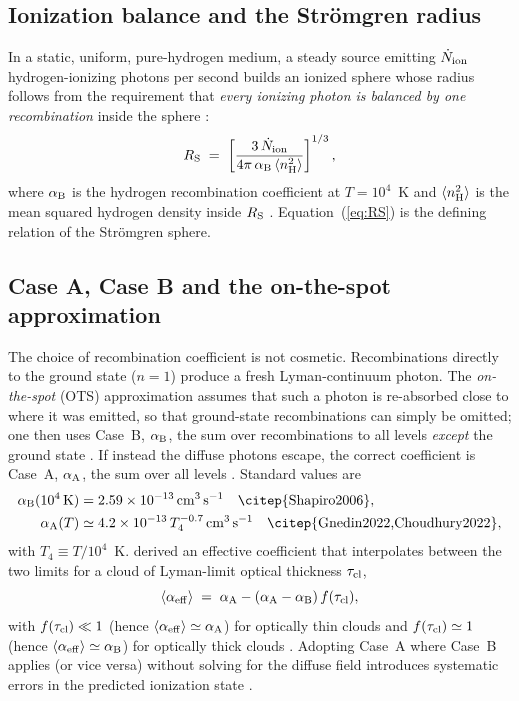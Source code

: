 \documentclass[11pt,a4paper]{article}
\newcommand{\Ndot}{\dot{N}_{\rm ion}}
\newcommand{\aB}{\alpha_{\rm B}}
\newcommand{\aA}{\alpha_{\rm A}}
\newcommand{\cms}{\,{\rm cm^{3}\,s^{-1}}}
\begin{document}
\subsection{Ionization balance and the Str\"omgren radius}
In a static, uniform, pure-hydrogen medium, a steady source emitting $\Ndot$ hydrogen-ionizing
photons per second builds an ionized sphere whose radius follows from the requirement that
\emph{every ionizing photon is balanced by one recombination} inside the sphere
\citep[eq.~1]{Cen2000}:
\begin{equation}
  R_{\rm S} \;=\; \left[\frac{3\,\Ndot}{4\pi\,\aB\,\langle n_{\rm H}^2\rangle}\right]^{1/3},
  \label{eq:RS}
\end{equation}
where $\aB$ is the hydrogen recombination coefficient at $T=10^4$~K and $\langle n_{\rm H}^2\rangle$
is the mean squared hydrogen density inside $R_{\rm S}$ \citep{Cen2000}. Equation~(\ref{eq:RS}) is
the defining relation of the Str\"omgren sphere.

\subsection{Case A, Case B and the on-the-spot approximation}
The choice of recombination coefficient is not cosmetic. Recombinations directly to the ground state
($n=1$) produce a fresh Lyman-continuum photon. The \emph{on-the-spot} (OTS) approximation assumes
that such a photon is re-absorbed close to where it was emitted, so that ground-state recombinations
can simply be omitted; one then uses Case~B, $\aB$, the sum over recombinations to all levels
\emph{except} the ground state \citep{Nebrin2023}. If instead the diffuse photons escape, the correct
coefficient is Case~A, $\aA$, the sum over all levels \citep{Nebrin2023}. Standard values are
\begin{align}
  \aB(10^4\,{\rm K}) &= 2.59\times10^{-13}\cms \quad \text{\citep{Shapiro2006}},\\
  \aA(T) &\simeq 4.2\times10^{-13}\,T_4^{-0.7}\cms \quad \text{\citep{Gnedin2022,Choudhury2022}},
\end{align}
with $T_4\equiv T/10^4$~K. \citet{Nebrin2023} derived an effective coefficient that interpolates
between the two limits for a cloud of Lyman-limit optical thickness $\tau_{\rm cl}$,
\begin{equation}
  \langle\alpha_{\rm eff}\rangle \;=\; \aA - (\aA-\aB)\,f(\tau_{\rm cl}),
  \label{eq:aeff}
\end{equation}
with $f(\tau_{\rm cl})\ll1$ (hence $\langle\alpha_{\rm eff}\rangle\simeq\aA$) for optically thin
clouds and $f(\tau_{\rm cl})\simeq1$ (hence $\langle\alpha_{\rm eff}\rangle\simeq\aB$) for optically
thick clouds \citep{Nebrin2023}. Adopting Case~A where Case~B applies (or vice versa) without
solving for the diffuse field introduces systematic errors in the predicted ionization state
\citep{Nebrin2023}.
\end{document}

